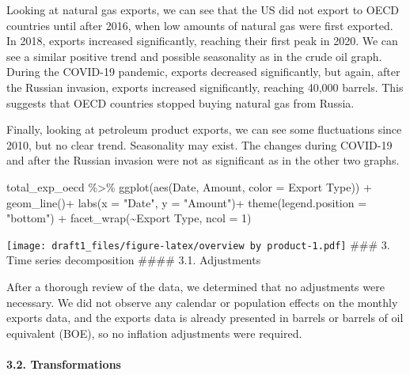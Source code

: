 \documentclass[
]{article}
\newenvironment{Shaded}{\begin{snugshade}}{\end{snugshade}}
\newcommand{\AttributeTok}[1]{\textcolor[rgb]{0.77,0.63,0.00}{#1}}
\newcommand{\DecValTok}[1]{\textcolor[rgb]{0.00,0.00,0.81}{#1}}
\newcommand{\FunctionTok}[1]{\textcolor[rgb]{0.00,0.00,0.00}{#1}}
\newcommand{\NormalTok}[1]{#1}
\newcommand{\SpecialCharTok}[1]{\textcolor[rgb]{0.00,0.00,0.00}{#1}}
\newcommand{\StringTok}[1]{\textcolor[rgb]{0.31,0.60,0.02}{#1}}
\begin{document}
Looking at natural gas exports, we can see that the US did not export to
OECD countries until after 2016, when low amounts of natural gas were
first exported. In 2018, exports increased significantly, reaching their
first peak in 2020. We can see a similar positive trend and possible
seasonality as in the crude oil graph. During the COVID-19 pandemic,
exports decreased significantly, but again, after the Russian invasion,
exports increased significantly, reaching 40,000 barrels. This suggests
that OECD countries stopped buying natural gas from Russia.

Finally, looking at petroleum product exports, we can see some
fluctuations since 2010, but no clear trend. Seasonality may exist. The
changes during COVID-19 and after the Russian invasion were not as
significant as in the other two graphs.

\begin{Shaded}
\begin{Highlighting}[]
\NormalTok{total\_exp\_oecd }\SpecialCharTok{\%\textgreater{}\%}  
  \FunctionTok{ggplot}\NormalTok{(}\FunctionTok{aes}\NormalTok{(Date, Amount, }\AttributeTok{color =} \StringTok{\textasciigrave{}}\AttributeTok{Export Type}\StringTok{\textasciigrave{}}\NormalTok{)) }\SpecialCharTok{+}
  \FunctionTok{geom\_line}\NormalTok{()}\SpecialCharTok{+}
  \FunctionTok{labs}\NormalTok{(}\AttributeTok{x =} \StringTok{"Date"}\NormalTok{, }\AttributeTok{y =} \StringTok{"Amount"}\NormalTok{)}\SpecialCharTok{+}
  \FunctionTok{theme}\NormalTok{(}\AttributeTok{legend.position =} \StringTok{"bottom"}\NormalTok{) }\SpecialCharTok{+}
  \FunctionTok{facet\_wrap}\NormalTok{(}\SpecialCharTok{\textasciitilde{}}\StringTok{\textasciigrave{}}\AttributeTok{Export Type}\StringTok{\textasciigrave{}}\NormalTok{, }\AttributeTok{ncol =} \DecValTok{1}\NormalTok{)}
\end{Highlighting}
\end{Shaded}

\texttt{[image: draft1\_files/figure-latex/overview by product-1.pdf]}
\#\#\# 3. Time series decomposition \#\#\#\# 3.1. Adjustments

After a thorough review of the data, we determined that no adjustments
were necessary. We did not observe any calendar or population effects on
the monthly exports data, and the exports data is already presented in
barrels or barrels of oil equivalent (BOE), so no inflation adjustments
were required.

\hypertarget{transformations}{%
\paragraph{3.2. Transformations}\label{transformations}}
\end{document}

